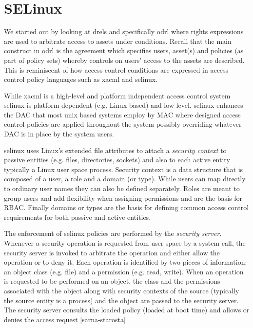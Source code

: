 \section{SELinux}
 
We started out by looking at \ac{drel}s and specifically \ac{odrl} where rights expressions are used to arbitrate access to assets under conditions. Recall that the main construct in \ac{odrl} is the agreement which specifies users, asset(s) and policies (as part of policy sets) whereby controls on users' access to the assets are described. This is reminiscent of how access control conditions are expressed in access control policy languages such as \ac{xacml} and \ac{selinux}.

While \ac{xacml} is a high-level and platform independent access control system \ac{selinux} is platform dependent (e.g. Linux based) and low-level. \ac{selinux} enhances the \ac{DAC} that most unix based systems employ by \ac{MAC} where designed access control policies are applied throughout the system possibly overriding whatever \ac{DAC} is in place by the system users. 

\ac{selinux} uses Linux's extended file attributes to attach a \emph{security context} to passive entities (e.g. files, directories, sockets) and also to each active entity typically a Linux user space process. Security context is a data structure that is composed of a user, a role and a domain (or type). While users can map directly to ordinary user names they can also be defined separately. Roles are meant to group users and add flexibility when assigning permissions and are the basis for \ac{RBAC}. Finally domains or types are the basis for defining common access control requirements for both passive and active entities. 


The enforcement of \ac{selinux} policies are performed by the \emph{security server}. Whenever a security operation is requested from user space by a system call, the security server is invoked to arbitrate the operation and either allow the operation or to deny it. Each operation is identified by two pieces of information: an object class (e.g. file) and a permission (e.g. read, write). When an operation is requested to be performed on an object, the class and the permissions associated with the object along with security contexts of the source (typically the source entity is a process) and the object are passed to the security server. The security server consults the loaded policy (loaded at 
boot time) and allows or denies the access request [sarna-starosta]

